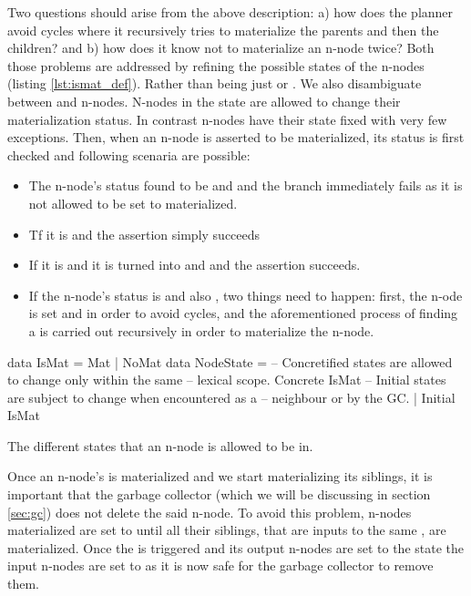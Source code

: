 Two questions should arise from the above description: a) how does the
planner avoid cycles where it recursively tries to materialize the
parents and then the children? and b) how does it know not to
materialize an n-node twice? Both those problems are addressed by
refining the possible states of the n-nodes (listing
\ref{lst:ismat_def}). Rather than being just  or
. We also disambiguate between  and
 n-nodes. N-nodes in the  state are allowed
to change their materialization status. In contrast 
n-nodes have their state fixed with very few exceptions. Then, when an
n-node is asserted to be materialized, its status is first checked and
following scenaria are possible:

\begin{itemize}
\item The n-node's status found to be  and 
  and the branch immediately fails as it is not allowed to be set to
  materialized.
\item Tf it is  and  the assertion simply
  succeeds
\item If it is  and  it is turned into
   and  and the assertion succeeds.
\item If the n-node's status is  and also ,
  two things need to happen: first, the n-ode is set  and
   in order to avoid cycles, and the aforementioned
  process of finding a  is carried out recursively in
  order to materialize the n-node.
\end{itemize}

\begin{code}
\begin{haskellcode}
data IsMat = Mat | NoMat
data NodeState =
  -- Concretified states are allowed to change only within the same
  -- lexical scope.
  Concrete IsMat
  -- Initial states are subject to change when encountered as a
  -- neighbour or by the GC.
  | Initial IsMat
\end{haskellcode}
  \caption{\label{lst:ismat_def}The different states that an n-node is
    allowed to be in.}
\end{code}

Once an n-node's is materialized and we start materializing its
siblings, it is important that the garbage collector (which we will be
discussing in section \ref{sec:gc}) does not delete the said n-node. To
avoid this problem, n-nodes materialized are set to 
until all their siblings, that are inputs to the same ,
are materialized. Once the  is triggered and its output
n-nodes are set to the  state the input n-nodes are set
to  as it is now safe for the garbage collector to
remove them.

